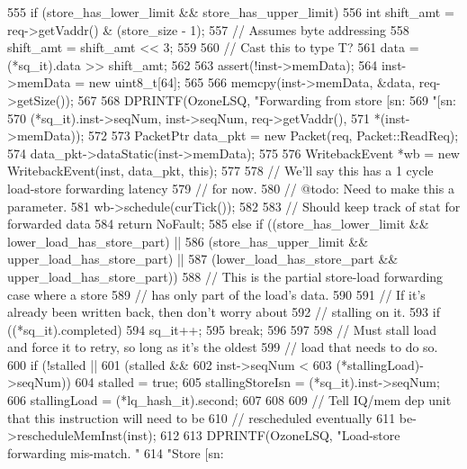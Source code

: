 \begin{DoxyCode}
{{555         if (store_has_lower_limit && store_has_upper_limit) {
556             int shift_amt = req->getVaddr() & (store_size - 1);
557             // Assumes byte addressing
558             shift_amt = shift_amt << 3;
559 
560             // Cast this to type T?
561             data = (*sq_it).data >> shift_amt;
562 
563             assert(!inst->memData);
564             inst->memData = new uint8_t[64];
565 
566             memcpy(inst->memData, &data, req->getSize());
567 
568             DPRINTF(OzoneLSQ, "Forwarding from store [sn:%
569                     "[sn:%
570                     (*sq_it).inst->seqNum, inst->seqNum, req->getVaddr(),
571                     *(inst->memData));
572 
573             PacketPtr data_pkt = new Packet(req, Packet::ReadReq);
574             data_pkt->dataStatic(inst->memData);
575 
576             WritebackEvent *wb = new WritebackEvent(inst, data_pkt, this);
577 
578             // We'll say this has a 1 cycle load-store forwarding latency
579             // for now.
580             // @todo: Need to make this a parameter.
581             wb->schedule(curTick());
582 
583             // Should keep track of stat for forwarded data
584             return NoFault;
585         } else if ((store_has_lower_limit && lower_load_has_store_part) ||
586                    (store_has_upper_limit && upper_load_has_store_part) ||
587                    (lower_load_has_store_part && upper_load_has_store_part)) {
588             // This is the partial store-load forwarding case where a store
589             // has only part of the load's data.
590 
591             // If it's already been written back, then don't worry about
592             // stalling on it.
593             if ((*sq_it).completed) {
594                 sq_it++;
595                 break;
596             }
597 
598             // Must stall load and force it to retry, so long as it's the oldest
599             // load that needs to do so.
600             if (!stalled ||
601                 (stalled &&
602                  inst->seqNum <
603                  (*stallingLoad)->seqNum)) {
604                 stalled = true;
605                 stallingStoreIsn = (*sq_it).inst->seqNum;
606                 stallingLoad = (*lq_hash_it).second;
607             }
608 
609             // Tell IQ/mem dep unit that this instruction will need to be
610             // rescheduled eventually
611             be->rescheduleMemInst(inst);
612 
613             DPRINTF(OzoneLSQ, "Load-store forwarding mis-match. "
614                     "Store [sn:%
}}}
\end{DoxyCode}
